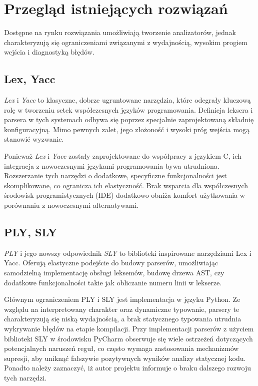 \section{Przegląd istniejących rozwiązań}
\label{sec:przeglad-istniejacych-rozwiazan}

Dostępne na rynku rozwiązania umożliwiają tworzenie analizatorów, jednak charakteryzują się ograniczeniami związanymi z wydajnością, wysokim progiem wejścia i diagnostyką błędów.

\subsection{Lex, Yacc}
\label{subsec:lex-yacc}

\textit{Lex}\cite{lesk1975lex} i \textit{Yacc}\cite{johnson1975yacc} to klasyczne, dobrze ugruntowane narzędzia, które odegrały kluczową rolę w tworzeniu setek współczesnych języków programowania.
Definicja leksera i parsera w tych systemach odbywa się poprzez specjalnie zaprojektowaną składnię konfiguracyjną.
Mimo pewnych zalet, jego złożoność i wysoki próg wejścia mogą stanowić wyzwanie.

Ponieważ \textit{Lex} i \textit{Yacc} zostały zaprojektowane do współpracy z językiem C, ich integracja z nowoczesnymi językami programowania bywa utrudniona.
Rozszerzanie tych narzędzi o dodatkowe, specyficzne funkcjonalności jest skomplikowane, co ogranicza ich elastyczność.
Brak wsparcia dla współczesnych środowisk programistycznych (IDE) dodatkowo obniża komfort użytkowania w porównaniu z nowoczesnymi alternatywami.


\subsection{PLY, SLY}
\label{subsec:ply-sly}

\textit{PLY}\cite{ply} i jego nowszy odpowiednik \textit{SLY}\cite{sly} to biblioteki inspirowane narzędziami Lex i Yacc.
Oferują elastyczne podejście do budowy parserów, umożliwiając samodzielną implementację obsługi leksemów, budowę drzewa AST, czy dodatkowe funkcjonalności takie jak obliczanie numeru linii w lekserze.

Głównym ograniczeniem PLY i SLY jest implementacja w języku Python.
Ze względu na interpretowany charakter oraz dynamiczne typowanie, parsery te charakteryzują się niską wydajnością, a brak statycznego typowania utrudnia wykrywanie błędów na etapie kompilacji.
Przy implementacji parserów z użyciem biblioteki SLY w środowisku PyCharm obserwuje się wiele ostrzeżeń dotyczących potencjalnych naruszeń reguł, co często wymaga zastosowania mechanizmów supresji, aby uniknąć fałszywie pozytywnych wyników analizy statycznej kodu.
Ponadto należy zaznaczyć, iż autor projektu informuje o braku dalszego rozwoju tych narzędzi\cite{sly-github}.

